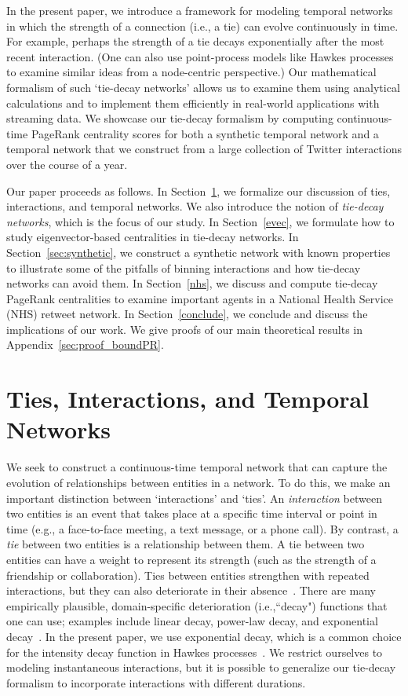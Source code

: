 \documentclass[journal,transmag]{IEEEtran}
\begin{document}
In the present paper, we introduce a framework for modeling temporal
networks in which the strength of a connection (i.e., a tie) can
evolve continuously in time. For example, perhaps the strength of a
tie decays exponentially after the most recent interaction. (One can also use point-process models like Hawkes processes \cite{laub2015} to examine similar ideas from a node-centric perspective.) Our mathematical formalism of such `tie-decay networks' allows us to
examine them using analytical calculations and to implement them
efficiently in real-world applications with streaming data. We
showcase our tie-decay formalism by computing continuous-time PageRank
centrality scores for both a synthetic temporal network and a temporal
network that we construct from a large collection of Twitter
interactions over the course of a year.

Our paper proceeds as follows. In Section~\ref{ties},
we formalize our discussion of ties, interactions, and temporal
networks. We also introduce the notion of \emph{tie-decay networks},
which is the focus of our study. In Section~\ref{evec}, we formulate
how to study eigenvector-based centralities in tie-decay networks.
In Section~\ref{sec:synthetic}, we construct a synthetic network with
known properties to illustrate some of the pitfalls of binning
interactions and how tie-decay networks can avoid them. In
Section~\ref{nhs}, we discuss and compute tie-decay PageRank
centralities to examine important agents in a National Health Service
(NHS) retweet network. In Section~\ref{conclude}, we conclude and
discuss the implications of our work. We give proofs of our main
theoretical results in Appendix~\ref{sec:proof_boundPR}.



\section{Ties, Interactions, and Temporal Networks} \label{ties}
%
We seek to construct a continuous-time temporal network that can
capture the evolution of relationships between entities in a network. To do this, we
make an important distinction between `interactions' and `ties'. An
\emph{interaction} between two entities is an event that takes place at
a specific time interval or point in time (e.g., a face-to-face
meeting, a text message, or a phone call). By contrast, a \emph{tie}
between two entities is a relationship between them. A tie between two entities can have a
weight to represent its strength (such as the strength of a friendship
or collaboration). Ties between entities strengthen with repeated
interactions, but they can also deteriorate in their
absence~\cite{Burt2000,moro2017,michalski2018}. There are many
empirically plausible, domain-specific deterioration (i.e.,``decay") functions
 that one can use; examples include linear decay, power-law decay, 
and exponential decay~\cite{Burt2000,moro2017,michalski2018,wixted1991form}.
In the present paper, we use exponential decay, which is a common choice for the intensity decay function in Hawkes processes~\cite{laub2015}.
We restrict ourselves to modeling instantaneous interactions, but it
is possible to generalize our tie-decay formalism to incorporate interactions with different durations.
\end{document}
